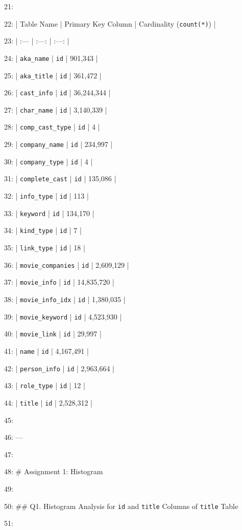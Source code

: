 \documentclass[11pt,a4paper]{article}
\begin{document}
21:

22: | Table Name | Primary Key Column | Cardinality (\texttt{count(*)}) |

23: | :--- | :---: | :---: |

24: | \texttt{aka\_name} | \texttt{id} | 901,343 |

25: | \texttt{aka\_title} | \texttt{id} | 361,472 |

26: | \texttt{cast\_info} | \texttt{id} | 36,244,344 |

27: | \texttt{char\_name} | \texttt{id} | 3,140,339 |

28: | \texttt{comp\_cast\_type} | \texttt{id} | 4 |

29: | \texttt{company\_name} | \texttt{id} | 234,997 |

30: | \texttt{company\_type} | \texttt{id} | 4 |

31: | \texttt{complete\_cast} | \texttt{id} | 135,086 |

32: | \texttt{info\_type} | \texttt{id} | 113 |

33: | \texttt{keyword} | \texttt{id} | 134,170 |

34: | \texttt{kind\_type} | \texttt{id} | 7 |

35: | \texttt{link\_type} | \texttt{id} | 18 |

36: | \texttt{movie\_companies} | \texttt{id} | 2,609,129 |

37: | \texttt{movie\_info} | \texttt{id} | 14,835,720 |

38: | \texttt{movie\_info\_idx} | \texttt{id} | 1,380,035 |

39: | \texttt{movie\_keyword} | \texttt{id} | 4,523,930 |

40: | \texttt{movie\_link} | \texttt{id} | 29,997 |

41: | \texttt{name} | \texttt{id} | 4,167,491 |

42: | \texttt{person\_info} | \texttt{id} | 2,963,664 |

43: | \texttt{role\_type} | \texttt{id} | 12 |

44: | \texttt{title} | \texttt{id} | 2,528,312 |

45:

46: ---

47:

48: \# Assignment 1: Histogram

49:

50: \#\# Q1. Histogram Analysis for \texttt{id} and \texttt{title} Columns of \texttt{title} Table

51:
\end{document}
